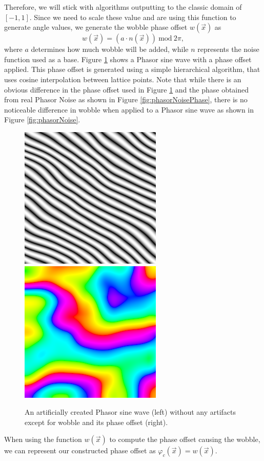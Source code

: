 \documentclass{utue} %
\begin{document}
Therefore, we will stick with algorithms outputting to the classic domain of $[-1,1]$. Since we need to scale these value and are using this function to generate angle values, we generate the wobble phase offset $w(\vec{x})$ as
$$
w(\vec{x}) = (a\cdot n(\vec{x}))\ \mathrm{mod}\ 2\pi,
$$
where $a$ determines how much wobble will be added, while $n$ represents the noise function used as a base. Figure \ref{fig:wobble} shows a Phasor sine wave with a phase offset applied. This phase offset is generated using a simple hierarchical algorithm, that uses cosine interpolation between lattice points. Note that while there is an obvious difference in the phase offset used in Figure \ref{fig:wobble} and the phase obtained from real Phasor Noise as shown in Figure \ref{fig:phasorNoisePhase}, there is no noticeable difference in wobble when applied to a Phasor sine wave as shown in Figure \ref{fig:phasorNoise}.
\begin{figure}[h]
  \centering
  \includegraphics[width=0.49\linewidth]{images/wobble}
  \includegraphics[width=0.49\linewidth]{images/wobblePhase}
  \caption{An artificially created Phasor sine wave (left) without any artifacts except for wobble and its phase offset (right).}\label{fig:wobble}
\end{figure}
When using the function $w(\vec{x})$ to compute the phase offset causing the wobble, we can represent our constructed phase offset as $\varphi_c(\vec{x}) = w(\vec{x})$.
\end{document}
